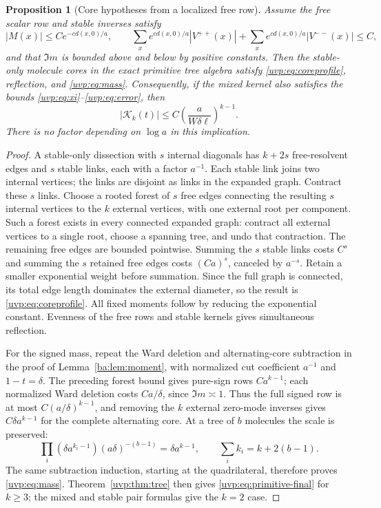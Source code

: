 \documentclass[11pt]{article}
\numberwithin{equation}{section}
\newtheorem{proposition}[theorem]{Proposition}
\theoremstyle{remark}
\begin{document}
\begin{proposition}[Core hypotheses from a localized free row]\label{uvp:prop:cores}
Assume the free scalar row and stable inverses satisfy
\[
 |M(x)|\le Ce^{-c d(x,0)/a},\qquad
 \sum_xe^{c d(x,0)/a}|V^{++}(x)|
 +\sum_xe^{c d(x,0)/a}|V^{--}(x)|\le C,
\]
and that $\Im m$ is bounded above and below by positive constants.
Then the stable-only molecule cores in the exact primitive tree
algebra satisfy \eqref{uvp:eq:coreprofile}, reflection, and
\eqref{uvp:eq:mass}. Consequently, if the mixed kernel also satisfies
the bounds \eqref{uvp:eq:xi}--\eqref{uvp:eq:error}, then
\begin{equation}\label{uvp:eq:primitive-final}
 |\mathcal K_k(t)|\le C\left(\frac{a}{W\delta\ell}\right)^{k-1}.
\end{equation}
There is no factor depending on $\log a$ in this implication.
\end{proposition}
\begin{proof}
A stable-only dissection with $s$ internal diagonals has $k+2s$
free-resolvent edges and $s$ stable links, each with a factor $a^{-1}$.
Each stable link joins two internal vertices; the links are disjoint
as links in the expanded graph. Contract these $s$ links. Choose a
rooted forest of $s$ free edges connecting the resulting $s$ internal
vertices to the $k$ external vertices, with one external root per
component. Such a forest exists in every connected expanded graph:
contract all external vertices to a single root, choose a spanning
tree, and undo that contraction. The remaining free edges are bounded
pointwise. Summing the $s$ stable links costs $C^s$ and summing the
$s$ retained free edges costs $(Ca)^s$, canceled by $a^{-s}$.
Retain a smaller exponential weight before summation. Since the full
graph is connected, its total edge length dominates the external
diameter, so the result is \eqref{uvp:eq:coreprofile}. All fixed moments
follow by reducing the exponential constant. Evenness of the free
rows and stable kernels gives simultaneous reflection.

For the signed mass, repeat the Ward deletion and alternating-core
subtraction in the proof of Lemma~\ref{ba:lem:moment}, with
normalized cut coefficient $a^{-1}$ and $1-t=\delta$.
The preceding forest bound gives pure-sign rows $Ca^{k-1}$;
each normalized Ward deletion costs $Ca/\delta$, since $\Im m\asymp1$.
Thus the full signed row is at most $C(a/\delta)^{k-1}$, and removing
the $k$ external zero-mode inverses gives $C\delta a^{k-1}$ for the
complete alternating core. At a tree of $b$ molecules the scale is preserved:
\[
 \prod_i(\delta a^{k_i-1})(a\delta)^{-(b-1)}
 =\delta a^{k-1},\qquad \sum_i k_i=k+2(b-1).
\]
The same subtraction induction, starting at the quadrilateral,
therefore proves \eqref{uvp:eq:mass}.
Theorem~\ref{uvp:thm:tree} then gives \eqref{uvp:eq:primitive-final} for
$k\ge3$; the mixed and stable pair formulas give the $k=2$ case.
\end{proof}
\end{document}
